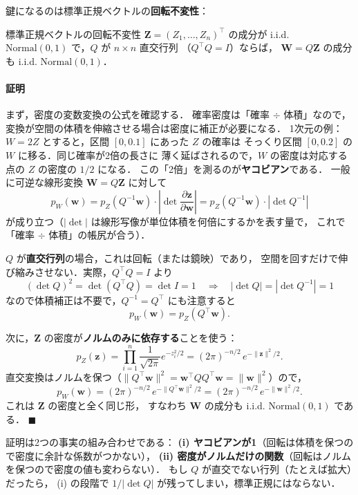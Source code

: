 \documentclass[lualatex,ja=standard,a4paper,12pt]{bxjsarticle}
\begin{document}
鍵になるのは標準正規ベクトルの\textbf{回転不変性}：

\begin{thmbox}{標準正規ベクトルの回転不変性}
$\boldsymbol{Z} = (Z_1, \ldots, Z_n)^\top$ の成分が i.i.d.
$\mathrm{Normal}(0,1)$ で，$Q$ が $n \times n$ 直交行列
（$Q^\top Q = I$）ならば，
$\boldsymbol{W} = Q\boldsymbol{Z}$ の成分も i.i.d. $\mathrm{Normal}(0,1)$．
\end{thmbox}

\paragraph{証明}
まず，密度の変数変換の公式を確認する．
確率密度は「確率 $\div$ 体積」なので，
変換が空間の体積を伸縮させる場合は密度に補正が必要になる．
1次元の例：$W = 2Z$ とすると，区間 $[0, 0.1]$ にあった $Z$ の確率は
そっくり区間 $[0, 0.2]$ の $W$ に移る．同じ確率が2倍の長さに
薄く延ばされるので，$W$ の密度は対応する点の $Z$ の密度の $1/2$ になる．
この「2倍」を測るのが\textbf{ヤコビアン}である．
一般に可逆な線形変換 $\boldsymbol{W} = Q\boldsymbol{Z}$ に対して
\[
  p_W(\boldsymbol{w})
  = p_Z(Q^{-1}\boldsymbol{w}) \cdot
    \left|\det \frac{\partial \boldsymbol{z}}{\partial \boldsymbol{w}}\right|
  = p_Z(Q^{-1}\boldsymbol{w}) \cdot |\det Q^{-1}|
\]
が成り立つ（$|\det|$ は線形写像が単位体積を何倍にするかを表す量で，
これで「確率 $\div$ 体積」の帳尻が合う）．

\medskip
$Q$ が\textbf{直交行列}の場合，これは回転（または鏡映）であり，
空間を回すだけで伸び縮みさせない．実際，$Q^\top Q = I$ より
\[
  (\det Q)^2 = \det(Q^\top Q) = \det I = 1
  \quad\Longrightarrow\quad
  |\det Q| = |\det Q^{-1}| = 1
\]
なので体積補正は不要で，$Q^{-1} = Q^\top$ にも注意すると
\[
  p_W(\boldsymbol{w}) = p_Z(Q^\top \boldsymbol{w}).
\]

\medskip
次に，$\boldsymbol{Z}$ の密度が\textbf{ノルムのみに依存する}ことを使う：
\[
  p_Z(\boldsymbol{z})
  = \prod_{i=1}^n \frac{1}{\sqrt{2\pi}} e^{-z_i^2/2}
  = (2\pi)^{-n/2}\, e^{-\|\boldsymbol{z}\|^2/2}.
\]
直交変換はノルムを保つ（$\|Q^\top\boldsymbol{w}\|^2
= \boldsymbol{w}^\top Q Q^\top \boldsymbol{w} = \|\boldsymbol{w}\|^2$）ので，
\[
  p_W(\boldsymbol{w})
  = (2\pi)^{-n/2}\, e^{-\|Q^\top\boldsymbol{w}\|^2/2}
  = (2\pi)^{-n/2}\, e^{-\|\boldsymbol{w}\|^2/2}.
\]
これは $\boldsymbol{Z}$ の密度と全く同じ形，
すなわち $\boldsymbol{W}$ の成分も i.i.d. $\mathrm{Normal}(0,1)$ である．
\hfill $\blacksquare$

\begin{pointbox}
証明は2つの事実の組み合わせである：
\textbf{(i) ヤコビアンが1}（回転は体積を保つので密度に余計な係数がつかない），
\textbf{(ii) 密度がノルムだけの関数}（回転はノルムを保つので密度の値も変わらない）．
もし $Q$ が直交でない行列（たとえば拡大）だったら，
(i) の段階で $1/|\det Q|$ が残ってしまい，標準正規にはならない．
\end{pointbox}
\end{document}

